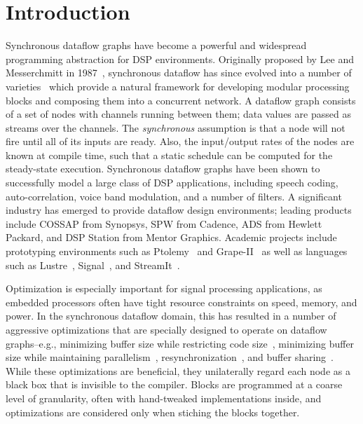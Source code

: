 \section{Introduction}

Synchronous dataflow graphs have become a powerful and widespread
programming abstraction for DSP environments.  Originally proposed by
Lee and Messerchmitt in 1987~\cite{LM87-i}, synchronous dataflow has
since evolved into a number of
varieties~\cite{BELP96,Bhatt00,Murthy2002,Buck93} which provide a
natural framework for developing modular processing blocks and
composing them into a concurrent network.  A dataflow graph consists
of a set of nodes with channels running between them; data values are
passed as streams over the channels.  The {\it synchronous} assumption
is that a node will not fire until all of its inputs are ready.  Also,
the input/output rates of the nodes are known at compile time, such
that a static schedule can be computed for the steady-state execution.
Synchronous dataflow graphs have been shown to successfully model a
large class of DSP applications, including speech coding,
auto-correlation, voice band modulation, and a number of filters.  A
significant industry has emerged to provide dataflow design
environments; leading products include COSSAP from Synopsys, SPW from
Cadence, ADS from Hewlett Packard, and DSP Station from Mentor
Graphics.  Academic projects include prototyping environments such as
Ptolemy~\cite{Lee01} and Grape-II~\cite{Lauw95} as well as languages
such as Lustre~\cite{lustre}, Signal~\cite{Gaut87}, and
StreamIt~\cite{Gordo02}.

Optimization is especially important for signal processing
applications, as embedded processors often have tight resource
constraints on speed, memory, and power.  In the synchronous dataflow
domain, this has resulted in a number of aggressive optimizations that
are specially designed to operate on dataflow graphs--e.g., minimizing
buffer size while restricting code size~\cite{murt1997x1}, minimizing
buffer size while maintaining parallelism~\cite{GGD94},
resynchronization~\cite{Bhatta2000}, and buffer
sharing~\cite{murt2001x1}.  While these optimizations are beneficial,
they unilaterally regard each node as a black box that is invisible to
the compiler.  Blocks are programmed at a coarse level of granularity,
often with hand-tweaked implementations inside, and optimizations are
considered only when stiching the blocks together.

